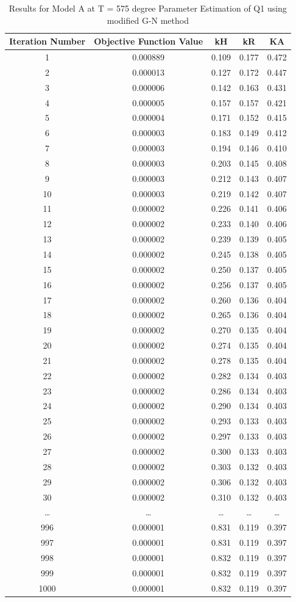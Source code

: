 \documentclass[a4paper,12pt]{article} %
\begin{document}
\begin{table}[ht]
    \caption{Results for Model A at T = 575 degree Parameter Estimation of Q1 using modified G-N method}
    \centering
    \begin{tabular}{|c|c|c|c|c|}
        \hline
        Iteration Number & Objective Function Value & kH & kR & KA \\
        \hline
        1 & 0.000889 & 0.109 & 0.177 & 0.472 \\
2 & 0.000013 & 0.127 & 0.172 & 0.447 \\
3 & 0.000006 & 0.142 & 0.163 & 0.431 \\
4 & 0.000005 & 0.157 & 0.157 & 0.421 \\
5 & 0.000004 & 0.171 & 0.152 & 0.415 \\
6 & 0.000003 & 0.183 & 0.149 & 0.412 \\
7 & 0.000003 & 0.194 & 0.146 & 0.410 \\
8 & 0.000003 & 0.203 & 0.145 & 0.408 \\
9 & 0.000003 & 0.212 & 0.143 & 0.407 \\
10 & 0.000003 & 0.219 & 0.142 & 0.407 \\
11 & 0.000002 & 0.226 & 0.141 & 0.406 \\
12 & 0.000002 & 0.233 & 0.140 & 0.406 \\
13 & 0.000002 & 0.239 & 0.139 & 0.405 \\
14 & 0.000002 & 0.245 & 0.138 & 0.405 \\
15 & 0.000002 & 0.250 & 0.137 & 0.405 \\
16 & 0.000002 & 0.256 & 0.137 & 0.405 \\
17 & 0.000002 & 0.260 & 0.136 & 0.404 \\
18 & 0.000002 & 0.265 & 0.136 & 0.404 \\
19 & 0.000002 & 0.270 & 0.135 & 0.404 \\
20 & 0.000002 & 0.274 & 0.135 & 0.404 \\
21 & 0.000002 & 0.278 & 0.135 & 0.404 \\
22 & 0.000002 & 0.282 & 0.134 & 0.403 \\
23 & 0.000002 & 0.286 & 0.134 & 0.403 \\
24 & 0.000002 & 0.290 & 0.134 & 0.403 \\
25 & 0.000002 & 0.293 & 0.133 & 0.403 \\
26 & 0.000002 & 0.297 & 0.133 & 0.403 \\
27 & 0.000002 & 0.300 & 0.133 & 0.403 \\
28 & 0.000002 & 0.303 & 0.132 & 0.403 \\
29 & 0.000002 & 0.306 & 0.132 & 0.403 \\
30 & 0.000002 & 0.310 & 0.132 & 0.403 \\
\ldots & \ldots & \ldots & \ldots & \ldots \\
996 & 0.000001 & 0.831 & 0.119 & 0.397 \\
997 & 0.000001 & 0.831 & 0.119 & 0.397 \\
998 & 0.000001 & 0.832 & 0.119 & 0.397 \\
999 & 0.000001 & 0.832 & 0.119 & 0.397 \\
1000 & 0.000001 & 0.832 & 0.119 & 0.397 \\


\end{tabular}
\end{table}
\end{document}
